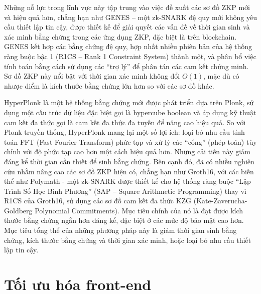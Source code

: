 
Những nỗ lực trong lĩnh vực này tập trung vào việc đề xuất các sơ đồ ZKP mới và hiệu quả hơn, chẳng hạn như GENES \cite{liu2025genes} -- một zk-SNARK đệ quy mới không yêu cầu thiết lập tin cậy, được thiết kế để giải quyết các vấn đề về thời gian sinh và xác minh bằng chứng trong các ứng dụng ZKP, đặc biệt là trên blockchain. GENES kết hợp các bằng chứng đệ quy, hợp nhất nhiều phiên bản của hệ thống ràng buộc bậc 1 (R1CS -- Rank 1 Constraint System) \cite{ben2013snarks} thành một, và phân bổ việc tính toán bằng cách sử dụng các ``trợ lý'' để phân tán các cam kết chứng minh. Sơ đồ ZKP này nổi bật với thời gian xác minh không đổi \(O(1)\), mặc dù có nhược điểm là kích thước bằng chứng lớn hơn so với các sơ đồ khác. 

HyperPlonk \cite{chen2023hyperplonk} là một hệ thống bằng chứng mới được phát triển dựa trên Plonk, sử dụng một cấu trúc dữ liệu đặc biệt gọi là hypercube boolean và áp dụng kỹ thuật cam kết đa thức gọi là cam kết đa thức đa tuyến để nâng cao hiệu quả. So với Plonk truyền thống, HyperPlonk mang lại một số lợi ích: loại bỏ nhu cầu tính toán FFT (Fast Fourier Transform) phức tạp và xử lý các ``cổng'' (phép toán) tùy chỉnh với độ phức tạp cao hơn một cách hiệu quả hơn. Những cải tiến này giảm đáng kể thời gian cần thiết để sinh bằng chứng. 
Bên cạnh đó, đã có nhiều nghiên cứu nhằm nâng cao các sơ đồ ZKP hiện có, chẳng hạn như Groth16, với các biến thể như Polymath \cite{lipmaa2024polymath} - một zk-SNARK được thiết kế cho hệ thống ràng buộc ``Lập Trình Số Học Bình Phương'' (SAP -- Square Arithmetic Programming) thay vì R1CS của Groth16, sử dụng các sơ đồ cam kết đa thức KZG (Kate-Zaverucha-Goldberg Polynomial Commitments). Mục tiêu chính của nó là đạt được kích thước bằng chứng ngắn hơn đáng kể, đặc biệt ở các mức độ bảo mật cao hơn. 
Mục tiêu tổng thể của những phương pháp này là giảm thời gian sinh bằng chứng, kích thước bằng chứng và thời gian xác minh, hoặc loại bỏ nhu cầu thiết lập tin cậy.

\section{Tối ưu hóa front-end}
